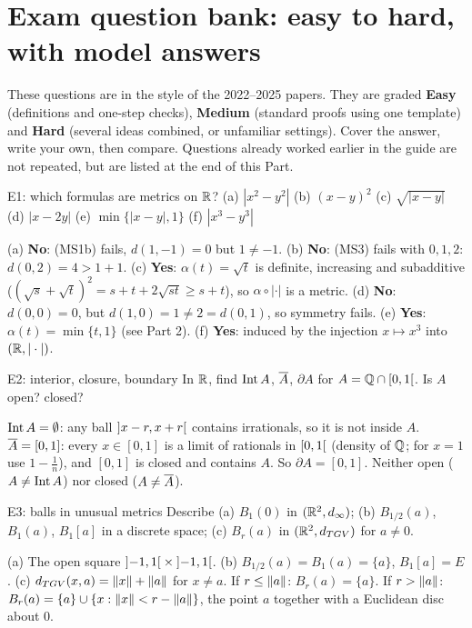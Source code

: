 \section{Exam question bank: easy to hard, with model answers}

\begin{plain}
These questions are in the style of the 2022--2025 papers. They are graded
\textbf{Easy} (definitions and one-step checks), \textbf{Medium} (standard proofs using one
template) and \textbf{Hard} (several ideas combined, or unfamiliar settings). Cover the answer,
write your own, then compare. Questions already worked earlier in the guide are not repeated,
but are listed at the end of this Part.
\end{plain}


\begin{exam}{E1: which formulas are metrics on $\mathbb R$?}
(a) $|x^2-y^2|$ \quad (b) $(x-y)^2$ \quad (c) $\sqrt{|x-y|}$ \quad (d) $|x-2y|$ \quad
(e) $\min\{|x-y|,1\}$ \quad (f) $|x^3-y^3|$
\end{exam}
\begin{answer}
(a) \textbf{No}: (MS1b) fails, $d(1,-1)=0$ but $1\ne-1$.
(b) \textbf{No}: (MS3) fails with $0,1,2$: $d(0,2)=4>1+1$.
(c) \textbf{Yes}: $\alpha(t)=\sqrt t$ is definite, increasing and subadditive
($(\sqrt s+\sqrt t)^2=s+t+2\sqrt{st}\ge s+t$), so $\alpha\circ|\cdot|$ is a metric.
(d) \textbf{No}: $d(0,0)=0$, but $d(1,0)=1\ne2=d(0,1)$, so symmetry fails.
(e) \textbf{Yes}: $\alpha(t)=\min\{t,1\}$ (see Part 2).
(f) \textbf{Yes}: induced by the injection $x\mapsto x^3$ into $(\mathbb R,|\cdot|)$.
\end{answer}

\begin{exam}{E2: interior, closure, boundary}
In $\mathbb R$, find $\operatorname{Int} A$, $\overline{A}$, $\partial A$ for $A=\mathbb Q\cap\mathopen{[}0,1\mathclose{[}$. Is $A$ open? closed?
\end{exam}
\begin{answer}
$\operatorname{Int} A=\emptyset$: any ball $\mathopen{]}x-r,x+r\mathclose{[}$ contains irrationals, so it is not inside $A$.
$\overline{A}=[0,1]$: every $x\in[0,1]$ is a limit of rationals in $\mathopen{[}0,1\mathclose{[}$ (density of $\mathbb Q$; for
$x=1$ use $1-\frac1n$), and $[0,1]$ is closed and contains $A$. So $\partial A=[0,1]$. Neither
open ($A\ne\operatorname{Int} A$) nor closed ($A\ne\overline{A}$).
\end{answer}

\begin{exam}{E3: balls in unusual metrics}
Describe (a) $B_1(0)$ in $(\mathbb R^2,d_\infty)$; (b) $B_{1/2}(a)$, $B_1(a)$, $B_1[a]$ in a discrete
space; (c) $B_r(a)$ in $(\mathbb R^2,d_{TGV})$ for $a\ne0$.
\end{exam}
\begin{answer}
(a) The open square $\mathopen{]}-1,1\mathclose{[}\times\mathopen{]}-1,1\mathclose{[}$.
(b) $B_{1/2}(a)=B_1(a)=\{a\}$, $B_1[a]=E$.
(c) $d_{TGV}(x,a)=\left\lVert x\right\rVert+\left\lVert a\right\rVert$ for $x\ne a$. If $r\le\left\lVert a\right\rVert$: $B_r(a)=\{a\}$. If $r>\left\lVert a\right\rVert$:
$B_r(a)=\{a\}\cup\{x:\left\lVert x\right\rVert<r-\left\lVert a\right\rVert\}$, the point $a$ together with a Euclidean disc about
$0$.
\end{answer}

